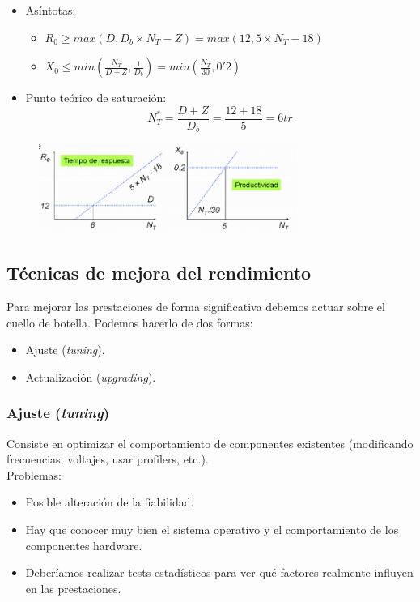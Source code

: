\documentclass[12pt,spanish]{article}
\begin{document}
\begin{itemize}
	\item Asíntotas:
		\begin{itemize}
			\item $R_0 \geq max(D, D_b \times N_T -Z) = max(12, 5 \times N_T -18)$
			\item $X_0 \leq min(\frac{N_T}{D + Z}, \frac{1}{D_b}) = min(\frac{N_T}{30}, 0'2)$
		\end{itemize}
	\item Punto teórico de saturación:
	\begin{equation*}
		N_T^* = \frac{D+Z}{D_b}=\frac{12+18}{5}=6 tr
	\end{equation*}
\end{itemize}

\begin{figure}[H]
	\centering
	\includegraphics[width=0.75\textwidth]{ejcerrada.png}
\end{figure}

\subsection{Técnicas de mejora del rendimiento}

Para mejorar las prestaciones de forma significativa debemos actuar sobre el cuello de botella. Podemos hacerlo de dos formas:

\begin{itemize}
	\item Ajuste (\textit{tuning}).
	\item Actualización (\textit{upgrading}).
\end{itemize}

\subsubsection{Ajuste (\textit{tuning})}

Consiste en optimizar el comportamiento de componentes existentes (modificando frecuencias, voltajes, usar profilers, etc.).\\

Problemas:
\begin{itemize}
	\item Posible alteración de la fiabilidad.
	\item Hay que conocer muy bien el sistema operativo y el comportamiento de los componentes hardware.
	\item Deberíamos realizar tests estadísticos para ver qué factores realmente influyen en las prestaciones.
\end{itemize}
\end{document}
